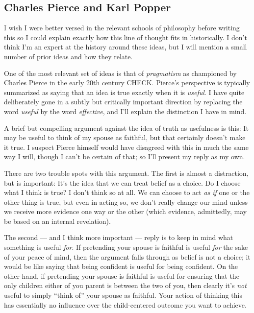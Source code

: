 \documentclass[20pt,]{extarticle}
\begin{document}
\subsection{Charles Pierce and Karl
Popper}\label{charles-pierce-and-karl-popper}

I wish I were better versed in the relevant schools of philosophy before
writing this so I could explain exactly how this line of thought fits in
historically. I don't think I'm an expert at the history around these
ideas, but I will mention a small number of prior ideas and how they
relate.

One of the most relevant set of ideas is that of \emph{pragmatism} as
championed by Charles Pierce in the early 20th century CHECK. Pierce's
perspective is typically summarized as saying that an idea is true
exactly when it is \emph{useful}. I have quite deliberately gone in a
subtly but critically important direction by replacing the word
\emph{useful} by the word \emph{effective}, and I'll explain the
distinction I have in mind.

A brief but compelling argument against the idea of truth as usefulness
is this: It may be useful to think of my spouse as faithful, but that
certainly doesn't make it true. I suspect Pierce himself would have
disagreed with this in much the same way I will, though I can't be
certain of that; so I'll present my reply as my own.

There are two trouble spots with this argument. The first is almost a
distraction, but is important: It's the idea that we can treat belief as
a choice. Do I choose what I think is true? I don't think so at all. We
can choose to act \emph{as if} one or the other thing is true, but even
in acting so, we don't really change our mind unless we receive more
evidence one way or the other (which evidence, admittedly, may be based
on an internal revelation).

The second --- and I think more important --- reply is to keep in mind
what something is useful \emph{for}. If pretending your spouse is
faithful is useful \emph{for} the sake of your peace of mind, then the
argument falls through as belief is not a choice; it would be like
saying that being confident is useful for being confident. On the other
hand, if pretending your spouse is faithful is useful for ensuring that
the only children either of you parent is between the two of you, then
clearly it's \emph{not} useful to simply ``think of'' your spouse as
faithful. Your action of thinking this has essentially no influence over
the child-centered outcome you want to achieve.
\end{document}
